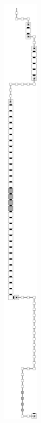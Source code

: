 \begin{figure}[H]
    \centering
    \begin{subfigure}[t]{0.2\textwidth}
        \centering
        \includegraphics[width=0.2\textwidth]{return_paths/return_digit1_read_digit2_general}

\end{subfigure}
\end{figure}
